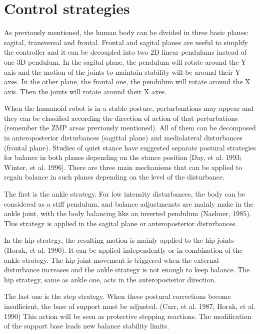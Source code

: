 




\section{Control strategies}
As previously mentioned, the human body can be divided in three basic planes: sagital, transversal and frontal. Frontal and sagital planes are useful to simplify the controller and it can be decoupled into two 2D linear pendulums instead of one 3D pendulum. In the sagital plane, the pendulum will rotate around the Y axis and the motion of the joints to maintain stability will be around their Y axes. In the other plane, the frontal one, the pendulum will rotate around the X axis.  Then the joints will rotate around their X axes.

When the humanoid robot is in a stable posture, perturbantions may appear and they can be classified according the direction of action of that perturbations (remember the ZMP areas previously mentioned). All of them can be decomposed in anteroposterior disturbances (sagittal plane) and mediolateral disturbances (frontal plane). Studies of quiet stance have suggested separate postural strategies for balance in both planes depending on the stance position [Day, et al. 1993; Winter, et al. 1996]. There are three main mechanisms that can be applied to regain balance in such planes depending on the level of the disturbance.

The first is the ankle strategy. For low intensity disturbances, the body can be considered as a stiff pendulum, and balance adjustmensts are mainly make in the ankle joint, with the body balancing like an inverted pendulum (Nashner, 1985). This strategy is applied in the sagital plane or anteroposterior disturbances.

In the hip strategy, the resulting motion is mainly applied to the hip joints (Horak, et al. 1990). It can be applied independently or in combination of the ankle strategy. The hip joint movement is triggered when the external disturbance increases and the ankle strategy is not enough to keep balance. The hip strategy, same as ankle one, acts in the anteroposterior direction.

The last one is the step strategy. When these postural corrections become insufficient, the base of support must be adjusted. (Carr, et al. 1987; Horak, et al. 1990) This action will be seen as protective stepping reactions. The modification of the support base leads new balance stability limits.

